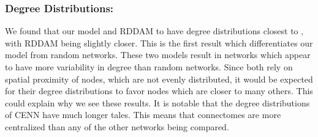 \subsubsection{Degree Distributions:} We found that our model and RDDAM to have degree distributions closest to \ce, with RDDAM being slightly closer. This is the first result which differentiates our model from random networks. These two models result in networks which appear to have more variability in degree than random networks. Since both rely on spatial proximity of nodes, which are not evenly distributed, it would be expected for their degree distributions to favor nodes which are closer to many others. This could explain why we see these results. It is notable that the degree distributions of CENN have much longer tales. This means that \ce connectomes are more centralized than any of the other networks being compared.